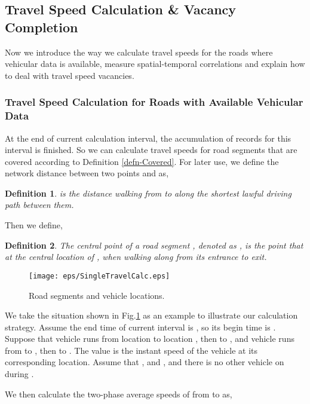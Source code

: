 \documentclass[twocolumn,10pt,final,conference]{IEEEtran}
\newtheorem{defn}{Definition}
\begin{document}
\subsection{Travel Speed Calculation \& Vacancy Completion}\label{section-Travel Speed Whole}
Now we introduce the way we calculate travel speeds for the roads where vehicular data is available, measure spatial-temporal correlations and explain how to deal with travel speed vacancies.

\subsubsection{Travel Speed Calculation for Roads with Available Vehicular Data}\label{section-Current TS when data available}
\quad

At the end of current calculation interval, the accumulation of records for this interval is finished. So we can calculate travel speeds for road segments that are covered according to Definition \ref{defn-Covered}.
For later use, we define the network distance between two points  and  as,
\begin{defn}\label{defn-dist for points}
 is the distance walking from  to  along the shortest lawful driving path between them.
\end{defn}

Then we define,
\begin{defn}\label{defn-central point}
The \emph{central point of a road segment} , denoted as , is the point that at the central location of , when walking along  from its entrance to exit.
\end{defn}
\begin{figure}[h]
  \centering
\texttt{[image: eps/SingleTravelCalc.eps]}

\caption{Road segments and vehicle locations.}
  \label{fig-Travel Speed With Available Data}
\end{figure}

We take the situation shown in Fig.\ref{fig-Travel Speed With Available Data} as an example to illustrate our calculation strategy. Assume the end time of current interval is , so its begin time is .
Suppose that vehicle  runs from location  to location , then to , and vehicle  runs from  to , then to . The value  is the instant speed of the vehicle at its corresponding location. Assume that , and , and there is no other vehicle on  during .

We then calculate the two-phase average speeds of  from  to  as,
\end{document}
